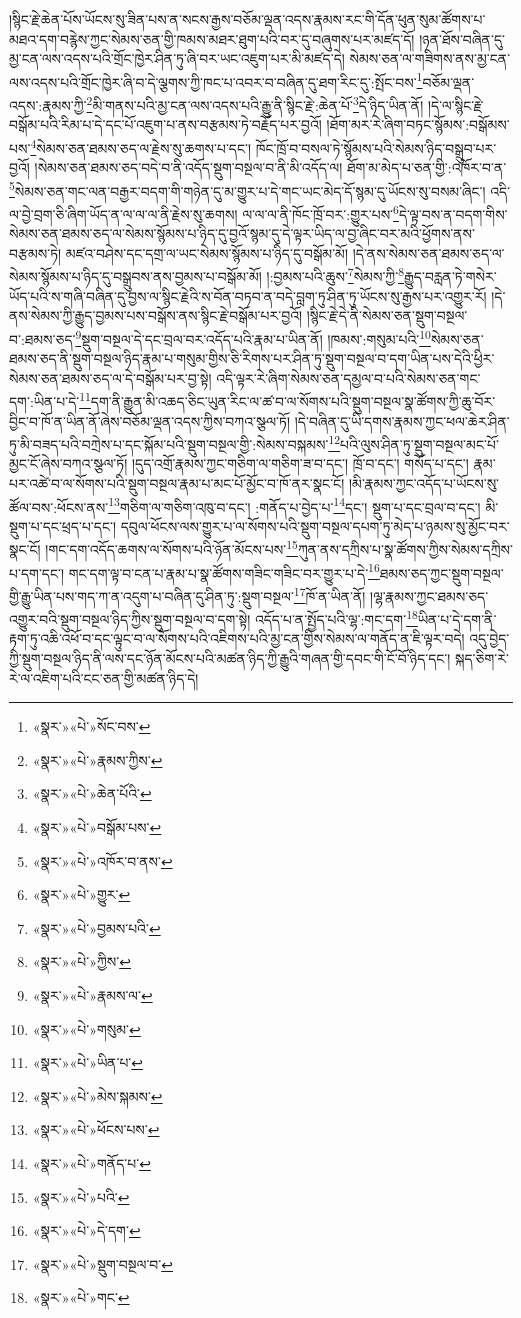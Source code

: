 །སྙིང་རྗེ་ཆེན་པོས་ཡོངས་སུ་ཟིན་པས་ན་སངས་རྒྱས་བཅོམ་ལྡན་འདས་རྣམས་རང་གི་དོན་ཕུན་སུམ་ཚོགས་པ་མཐའ་དག་བརྙེས་ཀྱང་སེམས་ཅན་གྱི་ཁམས་མཐར་ཐུག་པའི་བར་དུ་བཞུགས་པར་མཛད་དོ། །ཉན་ཐོས་བཞིན་དུ་མྱ་ངན་ལས་འདས་པའི་གྲོང་ཁྱེར་ཤིན་ཏུ་ཞི་བར་ཡང་འཇུག་པར་མི་མཛད་དེ། སེམས་ཅན་ལ་གཟིགས་ནས་མྱ་ངན་ལས་འདས་པའི་གྲོང་ཁྱེར་ཞི་བ་དེ་ལྕགས་ཀྱི་ཁང་པ་འབར་བ་བཞིན་དུ་ཐག་རིང་དུ་:སྤོང་བས་\footnote{«སྣར་»«པེ་»སོང་བས་}བཅོམ་ལྡན་འདས་:རྣམས་ཀྱི་\footnote{«སྣར་»«པེ་»རྣམས་ཀྱིས་}མི་གནས་པའི་མྱ་ངན་ལས་འདས་པའི་རྒྱུ་ནི་སྙིང་རྗེ་:ཆེན་པོ་\footnote{«སྣར་»«པེ་»ཆེན་པོའི་}དེ་ཉིད་ཡིན་ནོ། །དེ་ལ་སྙིང་རྗེ་བསྒོམ་པའི་རིམ་པ་དེ་དང་པོ་འཇུག་པ་ནས་བརྩམས་ཏེ་བརྗོད་པར་བྱའོ། །ཐོག་མར་རེ་ཞིག་བཏང་སྙོམས་:བསྒོམས་པས་\footnote{«སྣར་»«པེ་»བསྒོམ་པས་}སེམས་ཅན་ཐམས་ཅད་ལ་རྗེས་སུ་ཆགས་པ་དང་། ཁོང་ཁྲོ་བ་བསལ་ཏེ་སྙོམས་པའི་སེམས་ཉིད་བསྒྲུབ་པར་བྱའོ། །སེམས་ཅན་ཐམས་ཅད་བདེ་བ་ནི་འདོད་སྡུག་བསྔལ་བ་ནི་མི་འདོད་ལ། ཐོག་མ་མེད་པ་ཅན་གྱི་:འཁོར་བ་ན་\footnote{«སྣར་»«པེ་»འཁོར་བ་ནས་}སེམས་ཅན་གང་ལན་བརྒྱར་བདག་གི་གཉེན་དུ་མ་གྱུར་པ་དེ་གང་ཡང་མེད་དོ་སྙམ་དུ་ཡོངས་སུ་བསམ་ཞིང་། འདི་ལ་བྱེ་བྲག་ཅི་ཞིག་ཡོད་ན་ལ་ལ་ལ་ནི་རྗེས་སུ་ཆགས། ལ་ལ་ལ་ནི་ཁོང་ཁྲོ་བར་:གྱུར་པས་\footnote{«སྣར་»«པེ་»གྱུར་}དེ་ལྟ་བས་ན་བདག་གིས་སེམས་ཅན་ཐམས་ཅད་ལ་སེམས་སྙོམས་པ་ཉིད་དུ་བྱའོ་སྙམ་དུ་དེ་ལྟར་ཡིད་ལ་བྱ་ཞིང་བར་མའི་ཕྱོགས་ནས་བརྩམས་ཏེ། མཛའ་བཤེས་དང་དགྲ་ལ་ཡང་སེམས་སྙོམས་པ་ཉིད་དུ་བསྒོམ་མོ། །དེ་ནས་སེམས་ཅན་ཐམས་ཅད་ལ་སེམས་སྙོམས་པ་ཉིད་དུ་བསྒྲུབས་ནས་བྱམས་པ་བསྒོམ་མོ། །:བྱམས་པའི་ཆུས་\footnote{«སྣར་»«པེ་»བྱམས་པའི་}སེམས་ཀྱི་\footnote{«སྣར་»«པེ་»ཀྱིས་}རྒྱུད་བརླན་ཏེ་གསེར་ཡོད་པའི་ས་གཞི་བཞིན་དུ་བྱས་ལ་སྙིང་རྗེའི་ས་བོན་བཏབ་ན་བདེ་བླག་ཏུ་ཤིན་ཏུ་ཡོངས་སུ་རྒྱས་པར་འགྱུར་རོ། །དེ་ནས་སེམས་ཀྱི་རྒྱུད་བྱམས་པས་བསྒོས་ནས་སྙིང་རྗེ་བསྒོམ་པར་བྱའོ། །སྙིང་རྗེ་དེ་ནི་སེམས་ཅན་སྡུག་བསྔལ་བ་:ཐམས་ཅད་\footnote{«སྣར་»«པེ་»རྣམས་ལ་}སྡུག་བསྔལ་དེ་དང་བྲལ་བར་འདོད་པའི་རྣམ་པ་ཡིན་ནོ། །ཁམས་:གསུམ་པའི་\footnote{«སྣར་»«པེ་»གསུམ་}སེམས་ཅན་ཐམས་ཅད་ནི་སྡུག་བསྔལ་ཉིད་རྣམ་པ་གསུམ་གྱིས་ཅི་རིགས་པར་ཤིན་ཏུ་སྡུག་བསྔལ་བ་དག་ཡིན་པས་དེའི་ཕྱིར་སེམས་ཅན་ཐམས་ཅད་ལ་དེ་བསྒོམ་པར་བྱ་སྟེ། འདི་ལྟར་རེ་ཞིག་སེམས་ཅན་དམྱལ་བ་པའི་སེམས་ཅན་གང་དག་:ཡིན་པ་དེ་\footnote{«སྣར་»«པེ་»ཡིན་པ་}དག་ནི་རྒྱུན་མི་འཆད་ཅིང་ཡུན་རིང་ལ་ཚ་བ་ལ་སོགས་པའི་སྡུག་བསྔལ་སྣ་ཚོགས་ཀྱི་ཆུ་བོར་བྱིང་བ་ཁོ་ན་ཡིན་ནོ་ཞེས་བཅོམ་ལྡན་འདས་ཀྱིས་བཀའ་སྩལ་ཏོ། །དེ་བཞིན་དུ་ཡི་དགས་རྣམས་ཀྱང་ཕལ་ཆེར་ཤིན་ཏུ་མི་བཟད་པའི་བཀྲེས་པ་དང་སྐོམ་པའི་སྡུག་བསྔལ་གྱི་:སེམས་བསྐམས་\footnote{«སྣར་»«པེ་»མེས་སྐམས་}པའི་ལུས་ཤིན་ཏུ་སྡུག་བསྔལ་མང་པོ་མྱང་ངོ་ཞེས་བཀའ་སྩལ་ཏོ། །དུད་འགྲོ་རྣམས་ཀྱང་གཅིག་ལ་གཅིག་ཟ་བ་དང་། ཁྲོ་བ་དང་། གསོད་པ་དང་། རྣམ་པར་འཚེ་བ་ལ་སོགས་པའི་སྡུག་བསྔལ་རྣམ་པ་མང་པོ་མྱོང་བ་ཁོ་ནར་སྣང་ངོ། །མི་རྣམས་ཀྱང་འདོད་པ་ཡོངས་སུ་ཚོལ་བས་:ཕོངས་ནས་\footnote{«སྣར་»«པེ་»ཕོངས་པས་}གཅིག་ལ་གཅིག་འཁུ་བ་དང་། :གནོད་པ་བྱེད་པ་\footnote{«སྣར་»«པེ་»གནོད་པ་}དང་། སྡུག་པ་དང་བྲལ་བ་དང་། མི་སྡུག་པ་དང་ཕྲད་པ་དང་། དབུལ་ཕོངས་ལས་གྱུར་པ་ལ་སོགས་པའི་སྡུག་བསྔལ་དཔག་ཏུ་མེད་པ་ཉམས་སུ་མྱོང་བར་སྣང་ངོ། །གང་དག་འདོད་ཆགས་ལ་སོགས་པའི་ཉོན་མོངས་པས་\footnote{«སྣར་»«པེ་»པའི་}ཀུན་ནས་དཀྲིས་པ་སྣ་ཚོགས་ཀྱིས་སེམས་དཀྲིས་པ་དག་དང་། གང་དག་ལྟ་བ་ངན་པ་རྣམ་པ་སྣ་ཚོགས་གཟིང་གཟིང་བར་གྱུར་པ་དེ་\footnote{«སྣར་»«པེ་»དེ་དག་}ཐམས་ཅད་ཀྱང་སྡུག་བསྔལ་གྱི་རྒྱུ་ཡིན་པས་གད་ཀ་ན་འདུག་པ་བཞིན་དུ་ཤིན་ཏུ་:སྡུག་བསྔལ་\footnote{«སྣར་»«པེ་»སྡུག་བསྔལ་བ་}ཁོ་ན་ཡིན་ནོ། །ལྷ་རྣམས་ཀྱང་ཐམས་ཅད་འགྱུར་བའི་སྡུག་བསྔལ་ཉིད་ཀྱིས་སྡུག་བསྔལ་བ་དག་སྟེ། འདོད་པ་ན་སྤྱོད་པའི་ལྷ་:གང་དག་\footnote{«སྣར་»«པེ་»གང་}ཡིན་པ་དེ་དག་ནི་རྟག་ཏུ་འཆི་འཕོ་བ་དང་ལྟུང་བ་ལ་སོགས་པའི་འཇིགས་པའི་མྱ་ངན་གྱིས་སེམས་ལ་གནོད་ན་ཇི་ལྟར་བདེ། འདུ་བྱེད་ཀྱི་སྡུག་བསྔལ་ཉིད་ནི་ལས་དང་ཉོན་མོངས་པའི་མཚན་ཉིད་ཀྱི་རྒྱུའི་གཞན་གྱི་དབང་གི་ངོ་བོ་ཉིད་དང་། སྐད་ཅིག་རེ་རེ་ལ་འཇིག་པའི་ངང་ཅན་གྱི་མཚན་ཉིད་དེ། 
